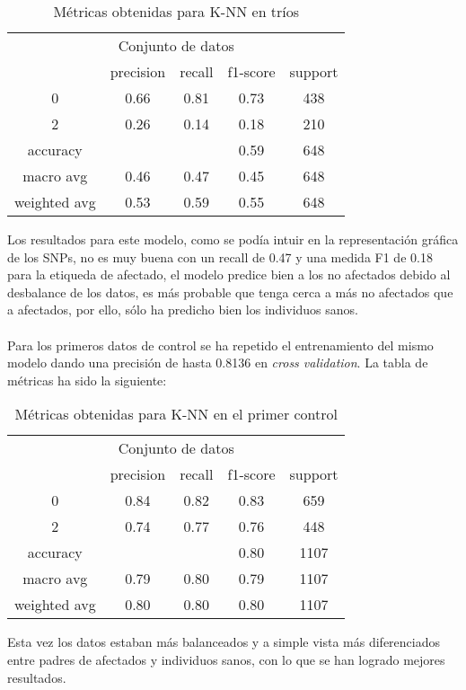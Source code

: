 \begin{table}[htpb]
  \centering
  \begin{tabular}{ccccc} \toprule
    \multicolumn{5}{c}{Conjunto de datos} \\ \cmidrule(r){1-5}
     & precision & recall & f1-score & support          \\ \midrule
    0 & 0.66 & 0.81 & 0.73 & 438          \\ 
    2 & 0.26 & 0.14 & 0.18 & 210          \\ 
    accuracy &  &  & 0.59 & 648          \\
    macro avg & 0.46 & 0.47 & 0.45 & 648          \\
    weighted avg & 0.53 & 0.59 & 0.55 & 648          \\ \bottomrule
  \end{tabular}
  \caption{Métricas obtenidas para K-NN en tríos}
  \label{tb:metricas-knn-trios}
\end{table}
Los resultados para este modelo, como se podía intuir en la representación gráfica de los SNPs, no es muy buena con un recall de 0.47 y una medida F1 de 0.18 para la etiqueda de afectado, el modelo predice bien a los no afectados debido al desbalance de los datos, es más probable que tenga cerca a más no afectados que a afectados, por ello, sólo ha predicho bien los individuos sanos.\\\\
Para los primeros datos de control se ha repetido el entrenamiento del mismo modelo dando una precisión de hasta 0.8136 en \textit{cross validation}. La tabla de métricas ha sido la siguiente:

\begin{table}[htpb]
  \centering
  \begin{tabular}{ccccc} \toprule
    \multicolumn{5}{c}{Conjunto de datos} \\ \cmidrule(r){1-5}
     & precision & recall & f1-score & support          \\ \midrule
    0 & 0.84 & 0.82 & 0.83 & 659          \\ 
    2 & 0.74 & 0.77 & 0.76 & 448          \\ 
    accuracy &  &  & 0.80 & 1107          \\
    macro avg & 0.79 & 0.80 & 0.79 & 1107          \\
    weighted avg & 0.80 & 0.80 & 0.80 & 1107          \\ \bottomrule
  \end{tabular}
  \caption{Métricas obtenidas para K-NN en el primer control}
  \label{tb:info-datasets}
\end{table}
Esta vez los datos estaban más balanceados y a simple vista más diferenciados entre padres de afectados y individuos sanos, con lo que se han logrado mejores resultados.

